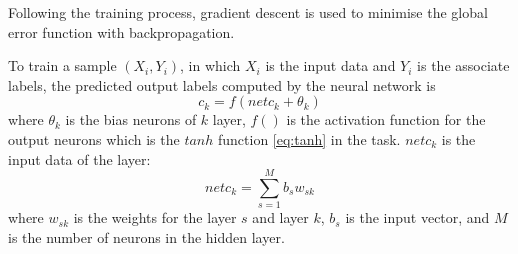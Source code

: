 Following the training process, gradient descent is used to minimise the global error function with backpropagation. 

To train a sample $(X_{i}, Y_{i})$, in which $X_{i}$ is the input data and $Y_{i}$ is the associate labels, the predicted output labels computed by the neural network is
\begin{equation}\label{eq:MultiLabelActivation}
c_{k} = f(netc_{k} + \theta_{k})
\end{equation}
where $\theta_{k}$ is the bias neurons of $k$ layer, $f()$ is the activation function for the output neurons which is the $tanh$ function \ref{eq:tanh} in the task. $netc_{k}$ is the input data of the layer:
\begin{equation}\label{eq:MultiLabel}
netc_{k} = \sum_{s=1}^M b_{s}w_{sk}
\end{equation}
where $w_{sk}$ is the weights for the layer $s$ and layer $k$, $b_{s}$ is the input vector, and $M$ is the number of neurons in the hidden layer.


